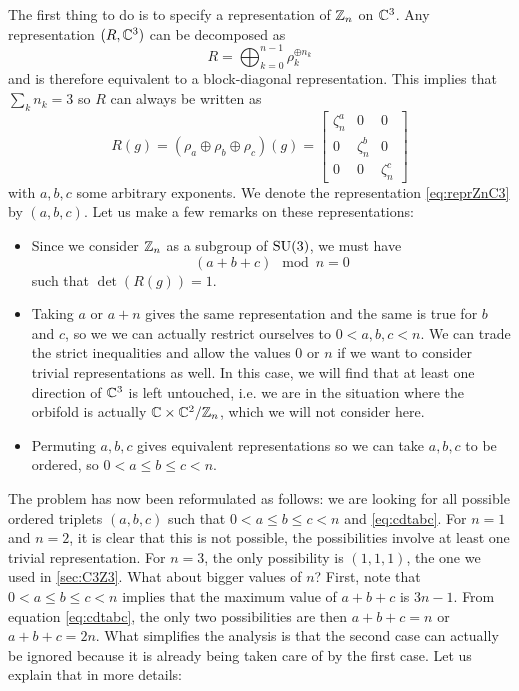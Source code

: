 \documentclass[a4paper,10pt]{article}
\begin{document}
            The first thing to do is to specify a representation of $\mathbb{Z}_n$ on $\mathbb{C}^3$. Any representation $(R,\mathbb{C}^3)$ can be decomposed as
            \begin{equation}
                R=\bigoplus^{n-1}_{k=0} \rho^{\oplus n_k}_k
            \end{equation}
            and is therefore equivalent to a block-diagonal representation. This implies that $\sum_kn_k=3$ so $R$ can always be written as
            \begin{equation}
                R(g)= (\rho_a\oplus\rho_b\oplus\rho_c)(g)=
                \begin{bmatrix}
                    \zeta^a_n & 0 & 0 \\
                    0 & \zeta^b_n & 0 \\
                    0 & 0 & \zeta^c_n
                \end{bmatrix}\label{eq:reprZnC3}
            \end{equation}
            with $a,b,c$ some arbitrary exponents. We denote the representation \eqref{eq:reprZnC3} by $(a,b,c)$. Let us make a few remarks on these representations:
            \begin{itemize}
                \item Since we consider $\mathbb{Z}_n$ as a subgroup of $\text{SU}(3)$, we must have
                \begin{equation}
                    (a+b+c)\mod n = 0\label{eq:cdtabc}
                \end{equation}
                such that $\det(R(g))=1$.
                \item Taking $a$ or $a+n$ gives the same representation and the same is true for $b$ and $c$, so we we can actually restrict ourselves to $0<a,b,c<n$. We can trade the strict inequalities and allow the values $0$ or $n$ if we want to consider trivial representations as well. In this case, we will find that at least one direction of $\mathbb{C}^3$ is left untouched, i.e. we are in the situation where the orbifold is actually $\mathbb{C}\times\mathbb{C}^2/\mathbb{Z}_n$, which we will not consider here.
                \item Permuting $a,b,c$ gives equivalent representations so we can take $a,b,c$ to be ordered, so $0<a\leq b\leq c<n$.
            \end{itemize}

            The problem has now been reformulated as follows:
            we are looking for all possible ordered triplets $(a,b,c)$ such that $0<a\leq b\leq c<n$ and \eqref{eq:cdtabc}. For $n=1$ and $n=2$, it is clear that this is not possible, the possibilities involve at least one trivial representation. For $n=3$, the only possibility is $(1,1,1)$, the one we used in \ref{sec:C3Z3}. What about bigger values of $n$? First, note that $0<a\leq b\leq c<n$ implies that the maximum value of $a+b+c$ is $3n-1$. From equation \eqref{eq:cdtabc}, the only two possibilities are then $a+b+c=n$ or $a+b+c=2n$. What simplifies the analysis is that the second case can actually be ignored because it is already being taken care of by the first case. Let us explain that in more details: \marker
            
\end{document}
